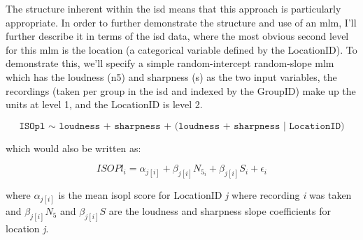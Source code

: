 The structure inherent within the \gls{isd} means that this approach is particularly appropriate. In order to further demonstrate the structure and use of an \gls{mlm}, I'll further describe it in terms of the \gls{isd} data, where the most obvious second level for this \gls{mlm} is the location (a categorical variable defined by the LocationID). To demonstrate this, we'll specify a simple random-intercept random-slope \gls{mlm} which has the loudness (\gls{n5}) and sharpness (\gls{s}) as the two input variables, the recordings (taken per group in the \gls{isd} and indexed by the GroupID) make up the units at level 1, and the LocationID is level 2. 

\begin{equation}
  \label{eqn:basicISDMLM}
  \texttt{ISOpl $\sim$ loudness + sharpness + (loudness + sharpness | LocationID)}
\end{equation}

which would also be written as:

\begin{equation}
  ISOPl_i = \alpha_{j[i]} + \beta_{j[i]}N_{5_i} + \beta_{j[i]}S_i + \epsilon_i
\end{equation}

where $\alpha_{j[i]}$ is the mean \gls{isopl} score for LocationID \emph{j} where recording \emph{i} was taken and $\beta_{j[i]}N_5$ and $\beta_{j[i]}S$ are the loudness and sharpness slope coefficients for location \emph{j}. 

